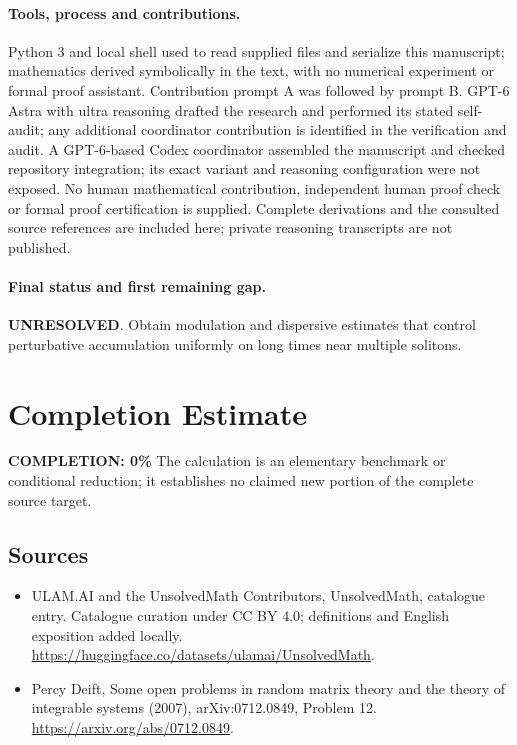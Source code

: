 \documentclass[11pt]{article}
\begin{document}
\paragraph{Tools, process and contributions.}
Python 3 and local shell used to read supplied files and serialize this manuscript; mathematics derived symbolically in the text, with no numerical experiment or formal proof assistant. Contribution prompt A was followed by prompt B. GPT-6 Astra with ultra reasoning drafted the research and performed its stated self-audit; any additional coordinator contribution is identified in the verification and audit. A GPT-6-based Codex coordinator assembled the manuscript and checked repository integration; its exact variant and reasoning configuration were not exposed. No human mathematical contribution, independent human proof check or formal proof certification is supplied. Complete derivations and the consulted source references are included here; private reasoning transcripts are not published.

\paragraph{Final status and first remaining gap.}
\textbf{UNRESOLVED}. Obtain modulation and dispersive estimates that control perturbative accumulation uniformly on long times near multiple solitons.

\section{Completion Estimate}
\noindent\textbf{COMPLETION: 0\%}
The calculation is an elementary benchmark or conditional reduction; it establishes no claimed new portion of the complete source target.

\subsection{Sources}
\begin{itemize}
\item[\hypertarget{source:statement:1}{S1}] ULAM.AI and the UnsolvedMath Contributors, UnsolvedMath, catalogue entry. Catalogue curation under CC BY 4.0; definitions and English exposition added locally.
\url{https://huggingface.co/datasets/ulamai/UnsolvedMath}.
\item[\hypertarget{source:statement:2}{S2}] Percy Deift, Some open problems in random matrix theory and the theory of integrable systems (2007), arXiv:0712.0849, Problem 12.
\url{https://arxiv.org/abs/0712.0849}.
\end{itemize}
\label{end:statement}
\end{document}
